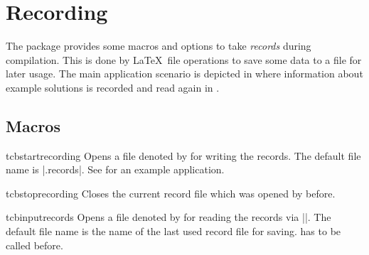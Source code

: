 \clearpage
\section{Recording}\label{sec:recording}%
%
The package provides some macros and options to take \emph{records} during
compilation. This is done by \LaTeX\ file operations to save some data
to a file for later usage. The main application scenario is depicted in
 where
information about example solutions is recorded and read again
in .

\subsection{Macros}\label{sec:recording-makros}
\begin{docCommand}[doc new=2014-11-28]{tcbstartrecording}{}
  Opens a file denoted by  for writing the records.
  The default file name is |\jobname.records|.
  See  for an example application.
\end{docCommand}


\begin{docCommand}[doc new=2014-11-28]{tcbstoprecording}{}
  Closes the current record file which was opened by 
  before.
\end{docCommand}

\begin{docCommand}[doc new=2014-11-28]{tcbinputrecords}{}
  Opens a file denoted by  for reading the records via ||.
  The default file name is the name of the last used record file for saving.
   has to be called before.
\end{docCommand}


